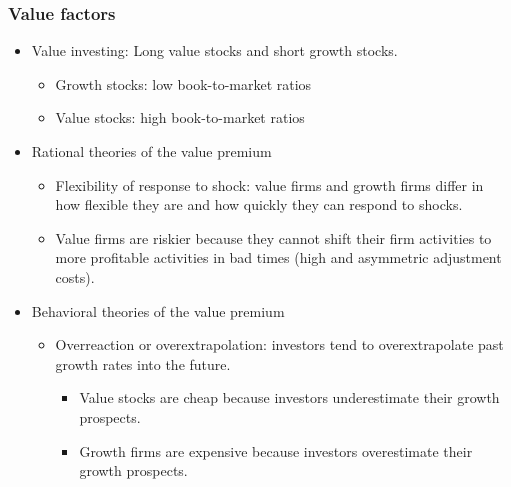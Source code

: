 \subsubsection{Value factors}
\begin{itemize}
\item Value investing: Long value stocks and short growth stocks.
    \begin{itemize}
    \item Growth stocks: low book-to-market ratios
    \item Value stocks: high book-to-market ratios
    \end{itemize}

\item Rational theories of the value premium
    \begin{itemize}
    \item Flexibility of response to shock: value firms and growth firms differ in how flexible they are and how quickly they can respond to shocks.
    \item Value firms are riskier because they cannot shift their firm activities to more profitable activities in bad times (high and asymmetric adjustment costs).
    \end{itemize}

\item Behavioral theories of the value premium
    \begin{itemize}
    \item Overreaction or overextrapolation: investors tend to overextrapolate past growth rates into the future.
        \begin{itemize}
        \item Value stocks are cheap because investors underestimate their growth prospects.
        \item Growth firms are expensive because investors overestimate their growth prospects.
        \end{itemize}
    \end{itemize}
\end{itemize}

